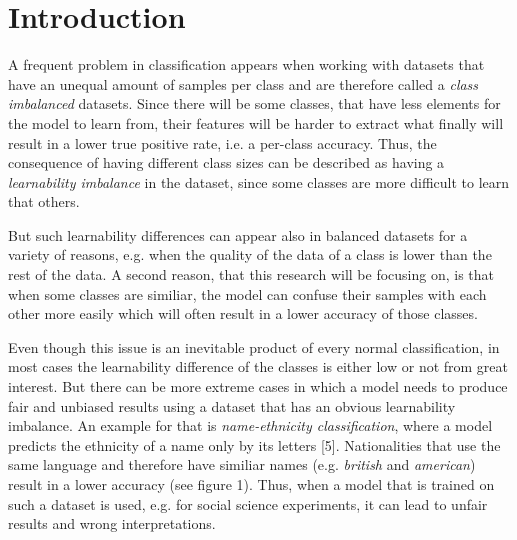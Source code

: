 \documentclass[journal]{IEEEtran}
\begin{document}
\begin{abstract}
\end{abstract}


\section{Introduction}
A frequent problem in classification appears when working with datasets that have an unequal amount of samples per class and are therefore called a \emph{class imbalanced} datasets. %
Since there will be some classes, that have less elements for the model to learn from, their features will be harder to extract what finally will result in a lower true positive rate, i.e. a per-class accuracy.
Thus, the consequence of having different class sizes can be described as having a \emph{learnability imbalance} in the dataset, since some classes are more difficult to learn that others.

But such learnability differences can appear also in balanced datasets for a variety of reasons, e.g. when the quality of the data of a class is lower than the rest of the data. %
A second reason, that this research will be focusing on, is that when some classes are similiar,
the model can confuse their samples with each other more easily which will often result in a lower accuracy of those classes.

Even though this issue is an inevitable product of every normal classification, in most cases the learnability difference of the classes is either low or not from great interest.
But there can be more extreme cases in which a model needs to produce fair and unbiased results using a dataset that has an obvious learnability imbalance. 
An example for that is \emph{name-ethnicity classification}, where a model predicts the ethnicity of a name only by its letters [5]. 
Nationalities that use the same language and therefore have similiar names (e.g. \emph{british} and \emph{american}) result in a lower accuracy (see figure 1).
Thus, when a model that is trained on such a dataset is used, e.g. for social science experiments, it can lead to unfair results and wrong interpretations. 
\end{document}
